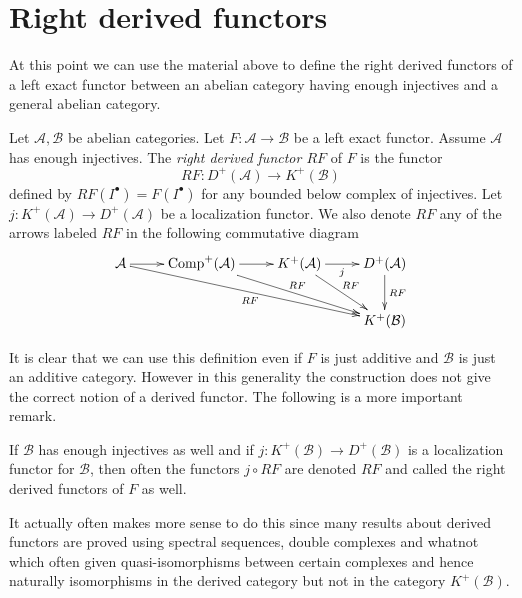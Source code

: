 \section{Right derived functors}
\label{section-right-derived-functor}

\noindent
At this point we can use the material above to define the right derived
functors of a left exact functor between an abelian category having
enough injectives and a general abelian category.

\begin{definition}
\label{definition-right-derived-functor}
Let $\mathcal{A}, \mathcal{B}$ be abelian categories.
Let $F : \mathcal{A} \to \mathcal{B}$ be a left exact functor.
Assume $\mathcal{A}$ has enough injectives.
The {\it right derived functor $RF$} of $F$ is the functor
$$
RF : D^{+}(\mathcal{A}) \longrightarrow K^{+}(\mathcal{B})
$$
defined by $RF(I^\bullet) = F(I^\bullet)$ for any bounded
below complex of injectives.
Let $j : K^{+}(\mathcal{A}) \to D^{+}(\mathcal{A})$ be
a localization functor. We also denote $RF$ any of the arrows
labeled $RF$ in the following commutative diagram
$$
\xymatrix{
\mathcal{A} \ar[r] \ar[rrrd]_{RF} &
\text{Comp}^{+}(\mathcal{A}) \ar[r] \ar[rrd]^{RF} &
K^{+}(\mathcal{A}) \ar[r]_j \ar[rd]^{RF} &
D^{+}(\mathcal{A}) \ar[d]^{RF} \\
& & & K^{+}(\mathcal{B})
}
$$
\end{definition}

\noindent
It is clear that we can use this definition even if $F$ is just additive
and $\mathcal{B}$ is just an additive category. However in this generality
the construction does not give the correct notion of a derived functor.
The following is a more important remark.

\begin{remark}
\label{remark-right-derived-functor}
If $\mathcal{B}$ has enough injectives as well and if
$j : K^{+}(\mathcal{B}) \to D^{+}(\mathcal{B})$ is a localization functor
for $\mathcal{B}$, then often the functors $j \circ RF$ are denoted
$RF$ and called the right derived functors of $F$ as well.
\end{remark}

\noindent
It actually often makes more sense to do this since many results about
derived functors are proved using spectral sequences, double complexes
and whatnot which often given quasi-isomorphisms between certain complexes
and hence naturally isomorphisms in the derived category but not in the
category $K^{+}(\mathcal{B})$.

